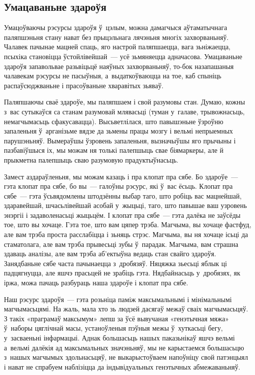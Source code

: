 \subsection*{Умацаваньне здароўя}

Умацоўваючы рэсурсы здароўя ў~цэлым, можна дамагчыся аўтаматычнага паляпшэньня стану нават без прыцэльнага лячэньня многіх захворваньняў. Чалавек пачынае мацней спаць, яго настрой паляпшаецца, вага зьніжаецца, псыхіка становіцца ўстойлівейшай~--- усё зьмяняецца адначасова. Умацаваньне здароўя запавольвае разьвіцьцё наяўных захворваньняў, то-бок назапашаныя чалавекам рэсурсы не пасыўныя, а~выдаткоўваюцца на тое, каб спыніць распаўсюджваньне і прасоўваньне хваравітых зьяваў.


Паляпшаючы сваё здароўе, мы паляпшаем і свой разумовы стан. Думаю, кожны з~вас сутыкаўся са станам разумовай млявасьці (туман у~галаве, трывожнасьць, немагчымасьць сфакусавацца). Высьветлілася, што павышэньне ўзроўню запаленьня ў~арганізьме вядзе да зьмены працы мозгу і вельмі непрыемных парушэньняў. Вымераўшы ўзровень запаленьня, вызначыўшы яго прычыны і пазбавіўшыся іх, мы можам ня толькі палепшыць свае біямаркеры, але й прыкметна палепшыць сваю разумовую прадуктыўнасьць. 


Замест аздараўленьня, мы можам казаць і пра клопат пра сябе. Бо здароўе~--- гэта клопат пра сябе, бо вы~--- галоўны рэсурс, які ў~вас ёсьць. Клопат пра сябе~--- гэта ўсьвядомлены штодзённы выбар таго, што робіць вас мацнейшай, здаравейшай, шчасьлівейшай асобай у~жыцьці, таго, што павышае ваш узровень энэргіі і задаволенасьці жыцьцём. І клопат пра сябе~--- гэта далёка не заўсёды тое, што вы хочаце. Гэта тое, што вам цяпер трэба. Магчыма, вы хочаце фастфуд, але вам трэба проста расслабіцца і зьняць стрэс. Магчыма, вы ня хочаце ісьці да стаматолага, але вам трэба прывесьці зубы ў~парадак. Магчыма, вам страшна здаваць аналізы, але вам трэба аб'ектыўна ведаць стан свайго здароўя. Занядбаньне сябе часта пачынаецца з~дробязяў. Няцяжка зьесьці яблык ці падцягнуцца, але яшчэ прасьцей не зрабіць гэта. Нядбайнасьць у~дробязях, як іржа, можа пачаць разбураць наша здароўе і клопат пра сябе.

Наш рэсурс здароўя~--- гэта розьніца паміж максымальнымі і мінімальнымі магчымасьцямі. На жаль, мала хто зь людзей дасягаў межаў сваіх магчымасьцяў. З такіх «праграмаў максымум» лепш за ўсё вывучаная «генэтычная мяжа» ў~наборы цяглічнай масы, устаноўленыя пэўныя межы ў~хуткасьці бегу, у~засваеньні інфармацыі. Аднак большасьць нашых паказьнікаў яшчэ вельмі а~вельмі далёкія ад максымальных значэньняў, мы не карыстаемся большасьцю з~нашых магчымых здольнасьцяў, не выкарыстоўваем напоўніцу свой патэнцыял і нават не спрабуем наблізіцца да індывідуальных генэтычных абмежаваньняў.

